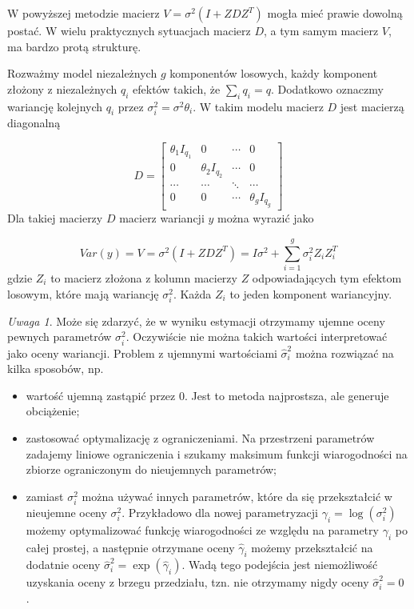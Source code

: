 \documentclass[12pt]{mwbk}
\theoremstyle{plain}
\theoremstyle{definition}
\theoremstyle{remark}
\newtheorem{uwaga}{Uwaga}[chapter]
\begin{document}
W powyższej metodzie macierz $V=\sigma^2(I+ZDZ^T)$ mogła mieć prawie dowolną postać. W wielu praktycznych sytuacjach macierz $D$, a tym samym macierz $V$, ma bardzo protą strukturę.

Rozważmy model niezależnych $g$ komponentów losowych, każdy komponent złożony z niezależnych $q_i$ efektów takich, że $\sum\limits_i q_i=q$. Dodatkowo oznaczmy wariancję kolejnych $q_i$ przez $\sigma^2_i=\sigma^2\theta_i$. W takim modelu macierz $D$ jest macierzą diagonalną

$$D=\begin{bmatrix}
\theta_1I_{q_1} & 0 & \cdots & 0 \\
0 & \theta_2I_{q_2} & \cdots & 0 \\
\cdots & \cdots & \ddots & \cdots \\
0 & 0 & \cdots & \theta_gI_{q_g}
\end{bmatrix}$$
Dla takiej macierzy $D$ macierz wariancji $y$ można wyrazić jako

$$Var(y)=V=\sigma^2(I+ZDZ^T)=I\sigma^2+\sum_{i=1}^{g}\sigma_i^2Z_iZ_i^T$$
gdzie $Z_i$ to macierz złożona z kolumn macierzy $Z$ odpowiadających tym efektom losowym, które mają wariancję $\sigma^2_i$. Każda $Z_i$ to jeden komponent wariancyjny.

\begin{uwaga}
	Może się zdarzyć, że w wyniku estymacji otrzymamy ujemne oceny pewnych parametrów $\sigma_i^2$. Oczywiście nie można takich wartości interpretować jako oceny wariancji. Problem z ujemnymi wartościami $\hat{\sigma}^2_i$ można rozwiązać na kilka sposobów, np.
	\begin{itemize}
		\item wartość ujemną zastąpić przez 0. Jest to metoda najprostsza, ale generuje obciążenie;
		\item zastosować optymalizację z ograniczeniami. Na przestrzeni parametrów zadajemy liniowe ograniczenia i szukamy maksimum funkcji wiarogodności na zbiorze ograniczonym do nieujemnych parametrów;
		\item zamiast $\sigma_i^2$ można używać innych parametrów, które da się przekształcić w nieujemne oceny $\sigma^2_i$. Przykładowo dla nowej parametryzacji $\gamma_i=\log(\sigma^2_i)$ możemy optymalizować funkcję wiarogodności ze względu na parametry $\gamma_i$ po całej prostej, a następnie otrzymane oceny $\hat{\gamma}_i$ możemy przekształcić na dodatnie oceny $\hat{\sigma}_i^2=\exp(\hat{\gamma}_i)$. Wadą tego podejścia jest niemożliwość uzyskania oceny z brzegu przedziału, tzn. nie otrzymamy nigdy oceny $\hat{\sigma}^2_i=0$ \cite{biecek}.
	\end{itemize}
\end{uwaga}
\end{document}
